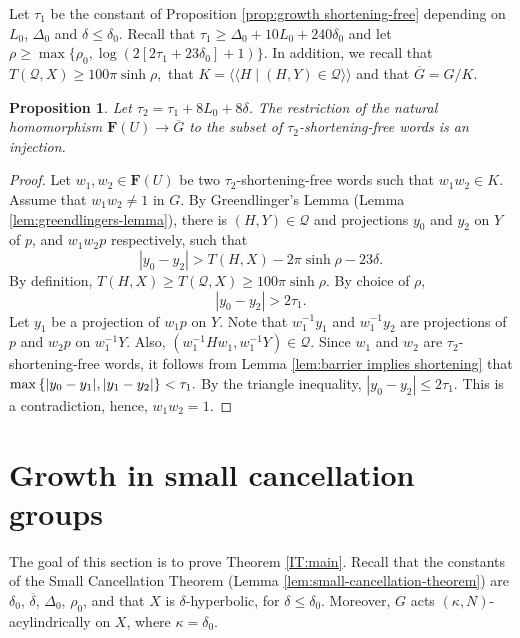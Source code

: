 \documentclass[leqno,a4paper,10pt]{amsart}
\theoremstyle{plain}
\newtheorem{prop}[thm]{Proposition}
\theoremstyle{definition}
\theoremstyle{remark}
\newcommand{\q}[1]{\overline{#1}}
\renewcommand{\leq}{\leqslant}
\renewcommand{\geq}{\geqslant}
\newcommand{\F}{\mathbf{F}}
\newcommand{\scrQ}{\mathscr{Q}}
\let\le\leqslant
\let\ge\geqslant
\let\leq\leqslant
\let\geq\geqslant
\newcommand{\lnormal}{%
	\langle\!\langle%
}
\newcommand{\rnormal}{%
	\rangle\!\rangle%
}
\newcommand{\normal}[1]{%
	\lnormal #1 \rnormal
}
\begin{document}
Let $\tau_1$ be the constant of Proposition \ref{prop:growth shortening-free} depending on $L_0$, $\Delta_0$ and $\delta\leqslant \delta_0$. Recall that $\tau_1\geq \Delta_0+10L_0+240\delta_0$ and let 
$\rho\ge \max\{\rho_0,\log(2[2\tau_1+23\delta_0]+1)\}.$ 
In addition, we recall that 
$T(\scrQ,X)\ge 100\pi\sinh\rho,$ 
that $K=\normal{H\mid (H,Y)\in \scrQ}$ and that $\q G= G/K$. 

\begin{prop}
	\label{prop:embedding shortening-free}
Let $\tau_2=\tau_1+8L_0+8\delta$. The restriction of the natural homomorphism $\F(U)\to \overline{G}$ to the subset of $\tau_2$-shortening-free words is an injection.
\end{prop}



\begin{proof}
Let $w_1,w_2\in \F(U)$ be two $\tau_2$-shortening-free words such that $w_1w_2\in K$. Assume that $w_1w_2\not =1$ in $G$. By Greendlinger's Lemma (Lemma \ref{lem:greendlingers-lemma}), there is $(H,Y)\in \scrQ$ and projections $y_0$ and $y_2$ on $Y$ of $p$, and $w_1w_2p$ respectively, such that 
	$$
	|y_0-y_2|>T(H,X)-2\pi\sinh\rho-23\delta.
	$$
	By definition, $T(H,X)\ge T(\scrQ,X)\ge 100\pi\sinh\rho$. By choice of $\rho$,  
	$$|y_0-y_2|>2\tau_1.$$
	Let $y_1$ be a projection of $w_1p$ on $Y$. Note that $w_1^{-1}y_1$ and $w_1^{-1}y_2$ are projections of $p$ and $w_2p$ on $w_1^{-1}Y$. Also, $(w_1^{-1}Hw_1,w_1^{-1}{Y})\in \scrQ$. Since $w_1$ and $w_2$ are $\tau_2$-shortening-free words, it follows from Lemma \ref{lem:barrier implies shortening} that $
		\max\qty{|y_0-y_1|,|y_1-y_2|} < \tau_1. 
	$ 	By the triangle inequality,
	$|y_0-y_2|\le  2\tau_1.$  
This is a contradiction, hence, $w_1w_2=1$.
\end{proof}

\section{Growth in small cancellation groups}
\label{sec:growth-small}

The goal of this section is to prove Theorem \ref{IT:main}.
 Recall that the constants of the Small Cancellation Theorem (Lemma \ref{lem:small-cancellation-theorem}) are $\delta_0$, $\q\delta$, $\Delta_0$, $\rho_0$, and that $X$ is $\delta$-hyperbolic, for $\delta\leq \delta_0$.  Moreover, $G$ acts $(\kappa,N)$-acylindrically on $X$, where $\kappa=\delta_0$. 
 
\end{document}
